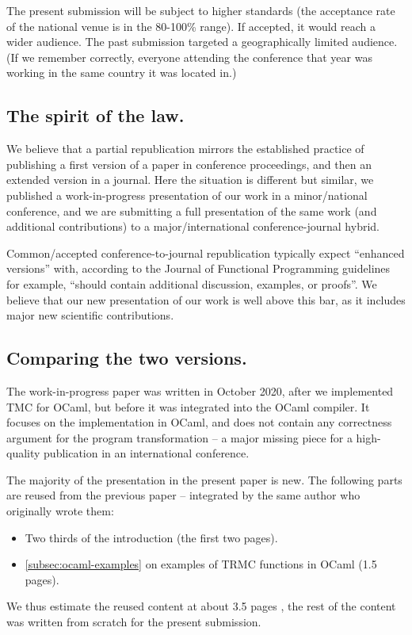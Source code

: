 The present submission will be subject to higher standards
(the acceptance rate of the national venue is in the
80-100\% range). If accepted, it would reach a wider audience. The
past submission targeted a geographically limited audience. (If we
remember correctly, everyone attending the conference that year was
working in the same country it was located in.)

\subsection{The spirit of the law.}

We believe that a partial republication mirrors the established
practice of publishing a first version of a paper in conference
proceedings, and then an extended version in a journal. Here the
situation is different but similar, we published a work-in-progress
presentation of our work in a minor/national conference, and we are
submitting a full presentation of the same work
(and additional contributions) to a major/international
conference-journal hybrid.

Common/accepted conference-to-journal republication typically expect
``enhanced versions'' with, according to the Journal of Functional
Programming guidelines for example, ``should contain additional
discussion, examples, or proofs''. We believe that our new
presentation of our work is well above this bar, as it includes major
new scientific contributions.

\subsection{Comparing the two versions.}

The work-in-progress paper was written in October 2020, after we
implemented TMC for OCaml, but before it was integrated into the OCaml
compiler. It focuses on the implementation in OCaml, and does not
contain any correctness argument for the program transformation --
a major missing piece for a high-quality publication in an
international conference.

The majority of the presentation in the present paper is new. The
following parts are reused from the previous paper --
integrated by the same author who originally wrote them:
\begin{itemize}
\item Two thirds of the introduction (the first two pages).
\item \cref{subsec:ocaml-examples} on examples of TRMC functions in OCaml (1.5 pages).
\end{itemize}
We thus estimate the reused content at about 3.5 pages , the rest of the content was written from scratch for the
present submission.

